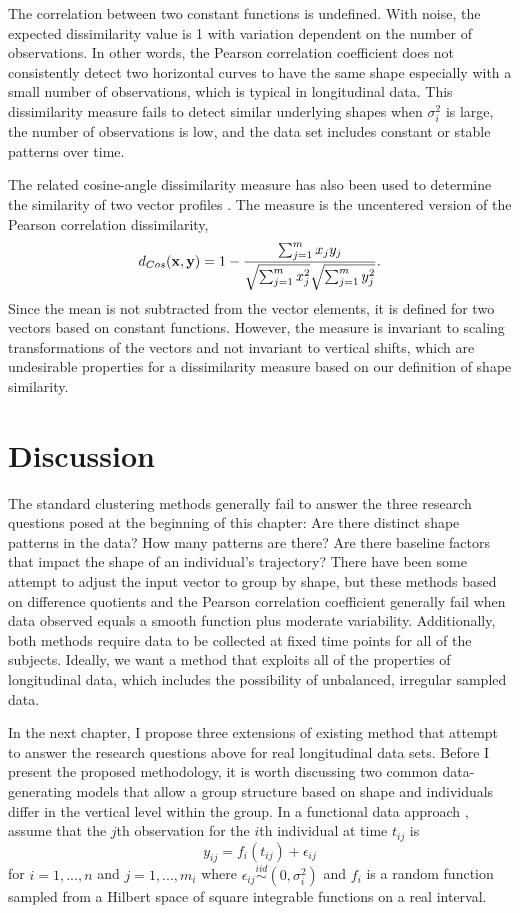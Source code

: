 The correlation between two constant functions is undefined. With noise, the expected dissimilarity value is 1 with variation dependent on the number of observations. In other words, the Pearson correlation coefficient does not consistently detect two horizontal curves to have the same shape especially with a small number of observations, which is typical in longitudinal data. This dissimilarity measure fails to detect similar underlying shapes when $\sigma_{i}^{2}$ is large, the number of observations is low, and the data set includes constant or stable patterns over time. 

The related cosine-angle dissimilarity measure has also been used to determine the similarity of two vector profiles \cite{eisen1998}. The measure is the uncentered version of the Pearson correlation dissimilarity,
$$d_{Cos}(\mathbf x,\mathbf y) = 1- \frac{\sum^{m}_{j=1}x_{j}y_{j}}{\sqrt{\sum^{m}_{j=1}x_{j}^{2}}\sqrt{\sum^{m}_{j=1}y_{j}^{2}}}.$$
Since the mean is not subtracted from the vector elements, it is defined for two vectors based on constant functions. However, the measure is invariant to scaling transformations of the vectors and not invariant to vertical shifts, which are undesirable properties for a dissimilarity measure based on our definition of shape similarity. 

\section{Discussion}
The standard clustering methods generally fail to answer the three research questions posed at the beginning of this chapter: Are there distinct shape patterns in the data? How many patterns are there? Are there baseline factors that impact the shape of an individual's trajectory? There have been some attempt to adjust the input vector to group by shape, but these methods based on difference quotients and the Pearson correlation coefficient generally fail when data observed equals a smooth function plus moderate variability. Additionally, both methods require data to be collected at fixed time points for all of the subjects. Ideally, we want a method that exploits all of the properties of longitudinal data, which includes the possibility of unbalanced, irregular sampled data.

In the next chapter, I propose three extensions of existing method that attempt to answer the research questions above for real longitudinal data sets. Before I present the proposed methodology, it is worth discussing two common data-generating models that allow a group structure based on shape and individuals differ in the vertical level within the group. In a functional data approach \cite{ramsay2002}, assume that the $j$th observation for the $i$th individual at time $t_{ij}$ is
$$y_{ij}= f_i(t_{ij})+\epsilon_{ij}$$
for $i=1,...,n$ and $j=1,...,m_{i}$ where $\epsilon_{ij}\overset{iid}{\sim} (0,\sigma_{i}^{2})$ and $f_{i}$ is a random function sampled from a Hilbert space of square integrable functions on a real interval. 

